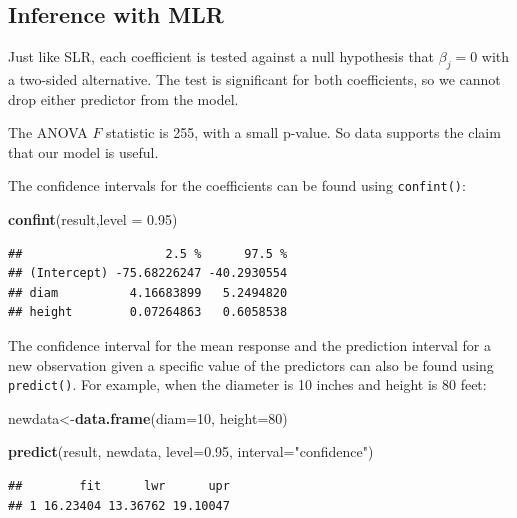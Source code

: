 \documentclass[
]{book}
\newenvironment{Shaded}{\begin{snugshade}}{\end{snugshade}}
\newcommand{\AttributeTok}[1]{\textcolor[rgb]{0.13,0.29,0.53}{#1}}
\newcommand{\DecValTok}[1]{\textcolor[rgb]{0.00,0.00,0.81}{#1}}
\newcommand{\FloatTok}[1]{\textcolor[rgb]{0.00,0.00,0.81}{#1}}
\newcommand{\FunctionTok}[1]{\textcolor[rgb]{0.13,0.29,0.53}{\textbf{#1}}}
\newcommand{\NormalTok}[1]{#1}
\newcommand{\OtherTok}[1]{\textcolor[rgb]{0.56,0.35,0.01}{#1}}
\newcommand{\StringTok}[1]{\textcolor[rgb]{0.31,0.60,0.02}{#1}}
\begin{document}
\hypertarget{inference-with-mlr}{%
\subsection*{Inference with MLR}\label{inference-with-mlr}}

Just like SLR, each coefficient is tested against a null hypothesis that \(\beta_j = 0\) with a two-sided alternative. The test is significant for both coefficients, so we cannot drop either predictor from the model.

The ANOVA \(F\) statistic is 255, with a small p-value. So data supports the claim that our model is useful.

The confidence intervals for the coefficients can be found using \texttt{confint()}:

\begin{Shaded}
\begin{Highlighting}[]
\FunctionTok{confint}\NormalTok{(result,}\AttributeTok{level =} \FloatTok{0.95}\NormalTok{)}
\end{Highlighting}
\end{Shaded}

\begin{verbatim}
##                    2.5 %      97.5 %
## (Intercept) -75.68226247 -40.2930554
## diam          4.16683899   5.2494820
## height        0.07264863   0.6058538
\end{verbatim}

The confidence interval for the mean response and the prediction interval for a new observation given a specific value of the predictors can also be found using \texttt{predict()}. For example, when the diameter is 10 inches and height is 80 feet:

\begin{Shaded}
\begin{Highlighting}[]
\NormalTok{newdata}\OtherTok{\textless{}{-}}\FunctionTok{data.frame}\NormalTok{(}\AttributeTok{diam=}\DecValTok{10}\NormalTok{, }\AttributeTok{height=}\DecValTok{80}\NormalTok{)}

\FunctionTok{predict}\NormalTok{(result, newdata, }\AttributeTok{level=}\FloatTok{0.95}\NormalTok{,}
        \AttributeTok{interval=}\StringTok{"confidence"}\NormalTok{)}
\end{Highlighting}
\end{Shaded}

\begin{verbatim}
##        fit      lwr      upr
## 1 16.23404 13.36762 19.10047
\end{verbatim}
\end{document}
